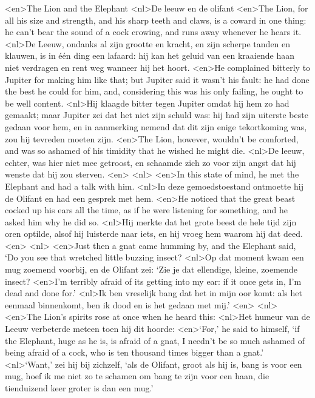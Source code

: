<en>The Lion and the  Elephant
<nl>De leeuw en de olifant
<en>The Lion, for all his size and strength, and his sharp teeth and claws, is a coward in one thing: he can’t bear the sound of a cock crowing, and runs away whenever he hears it.
<nl>De Leeuw, ondanks al zijn grootte en kracht, en zijn scherpe tanden en klauwen, is in één ding een lafaard: hij kan het geluid van een kraaiende haan niet verdragen en rent weg wanneer hij het hoort.
<en>He complained bitterly to Jupiter for making him like that; but Jupiter said it wasn’t his fault: he had done the best he could for him, and, considering this was his only failing, he ought to be well content.
<nl>Hij klaagde bitter tegen Jupiter omdat hij hem zo had gemaakt; maar Jupiter zei dat het niet zijn schuld was: hij had zijn uiterste  beste gedaan voor hem, en in aanmerking nemend dat dit zijn enige tekortkoming was, zou hij tevreden moeten zijn.
<en>The Lion, however, wouldn’t be comforted, and was so ashamed of his timidity that he wished he might die.
<nl>De leeuw, echter, was hier niet mee getroost, en schaamde zich zo voor zijn angst dat hij wenste dat hij zou sterven.
<en>
<nl>
<en>In this state of mind, he met the Elephant and had a talk with him.
<nl>In deze gemoedstoestand ontmoette hij de Olifant en had een gesprek met hem.
<en>He noticed that the great beast cocked up his ears all the time, as if he were listening for something, and he asked him why he did so.
<nl>Hij merkte dat het grote beest de hele tijd zijn oren optilde, alsof hij luisterde naar iets, en hij vroeg hem waarom hij dat deed.
<en>
<nl>
<en>Just then a gnat came humming by, and the Elephant said, `Do you see that wretched little buzzing insect?
<nl>Op dat moment kwam een mug zoemend voorbij, en de Olifant zei: `Zie je dat ellendige, kleine, zoemende insect?
<en>I’m terribly afraid of its getting into my ear: if it once gets in, I’m dead and done for.'
<nl>Ik ben vreselijk bang dat het in mijn oor komt: als het eenmaal binnenkomt, ben ik dood en is het gedaan met mij.'
<en>
<nl>
<en>The Lion’s spirits rose at once when he heard this: 
<nl>Het humeur van de Leeuw verbeterde meteen toen hij dit hoorde: 
<en>`For,' he said to himself, `if the Elephant, huge as he is, is afraid of a gnat, I needn’t be so much ashamed of being afraid of a cock, who is ten thousand times bigger than a gnat.'
<nl>`Want,' zei hij bij zichzelf, `als de Olifant, groot als hij is, bang is voor een mug, hoef ik me niet zo te schamen om bang te zijn voor een haan, die tienduizend keer groter is dan een mug.'
